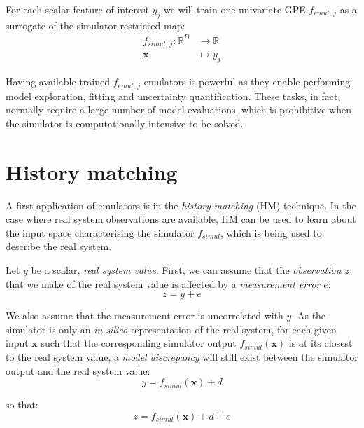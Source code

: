 \vspace{0.2cm}
For each scalar feature of interest $y_j$ we will train one univariate GPE $f_{emul,\,j}$ as a surrogate of the simulator restricted map:
%
\begin{align}\label{eq:univariatesimulator}
    f_{simul,\,j}\colon\mathbb{R}^{D} &\to \mathbb{R} \\
    \mathbf{x} &\mapsto y_j \nonumber
\end{align}

\noindent
Having available trained $f_{emul,\,j}$ emulators is powerful as they enable performing model exploration, fitting and uncertainty quantification. These tasks, in fact, normally require a large number of model evaluations, which is prohibitive when the simulator is computationally intensive to be solved.


%
%
%
\section{History matching}\label{sec:ch3historymatching}
A first application of emulators is in the \textit{history matching} (\acs{HM}) technique. In the case where real system observations are available, HM can be used to learn about the input space characterising the simulator $f_{simul}$, which is being used to describe the real system.

\vspace{0.2cm}
Let $y$ be a scalar, \textit{real system value}. First, we can assume that the \textit{observation} $z$ that we make of the real system value is affected by a \textit{measurement error} $e$:
%
\begin{equation}
z = y + e
\end{equation}

\noindent
We also assume that the measurement error is uncorrelated with $y$. As the simulator is only an \textit{in silico} representation of the real system, for each given input $\mathbf{x}$ such that the corresponding simulator output $f_{simul}(\mathbf{x})$ is at its closest to the real system value, a \textit{model discrepancy} will still exist between the simulator output and the real system value:
%
\begin{equation}
y = f_{simul}(\mathbf{x}) + d
\end{equation}

\noindent
so that:
%
\begin{equation}\label{eq:modeldiscrerr}
z = f_{simul}(\mathbf{x}) + d + e
\end{equation}

